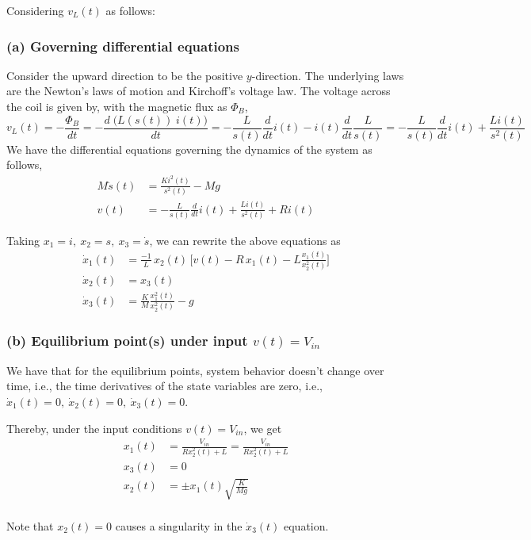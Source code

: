 Considering \( v_L(t) \) as follows:

\subsubsection*{(a) Governing differential equations}

Consider the upward direction to be the positive \(y\)-direction.
The underlying laws are the Newton's laws of motion and Kirchoff's voltage law.
The voltage across the coil is given by, with the magnetic flux as \( \Phi_B \),
\[
    v_L(t)
    = -\frac{\Phi_B}{dt}
    = -\frac{d\; \Big( L(s(t))\; i(t) \Big)}{dt}
    = -\frac{L}{s(t)} \frac{d}{dt} i(t)
    - i(t) \frac{d}{dt} \frac{L}{s(t)}
    = -\frac{L}{s(t)} \frac{d}{dt} i(t)
    + \frac{Li(t)}{s^2(t)}
\]
We have the differential equations governing the dynamics of the system as follows,
\begin{align*}
    M \ddot s(t) & = \frac{Ki^2(t)}{s^2(t)} - Mg       \\
    v(t)         & = -\frac{L}{s(t)} \frac{d}{dt} i(t)
    + \frac{Li(t)}{s^2(t)} + R i(t)
\end{align*}

Taking \( x_1 = i, \ x_2 = s, \ x_3 = \dot s \), we can rewrite the above equations as
\[
    \boxed{
        \begin{aligned}
            \dot x_1(t) & = \frac{-1}{L}\, x_2(t)\, \Big[ v(t) - R\, x_1(t) - L \frac{x_1(t)}{x_2^2(t)} \Big] \\
            \dot x_2(t) & = x_3(t)                                                                            \\
            \dot x_3(t) & = \frac{K}{M} \frac{x_1^2(t)}{x_2^2(t)} - g
        \end{aligned}
    }
\]

\subsubsection*{(b) Equilibrium point(s) under input \(v(t)=V_{in}\)}

We have that for the equilibrium points, system behavior doesn't change over time, i.e., the time derivatives of the state variables are zero, i.e., \( \dot x_1(t) = 0, \ \dot x_2(t) = 0, \ \dot x_3(t) = 0 \).

Thereby, under the input conditions \( v(t)=V_{in} \), we get
\begin{align*}
    x_1(t) & = \frac{V_{in}}{Rx_2^2(t)+L} = \frac{V_{in}}{Rx_2^2(t)+L} \\
    x_3(t) & = 0                                                       \\
    x_2(t) & = \pm x_1(t) \sqrt{\frac{K}{Mg}}                          \\
\end{align*}

Note that \( x_2(t) = 0 \) causes a singularity in the \( \dot x_3(t) \) equation.
